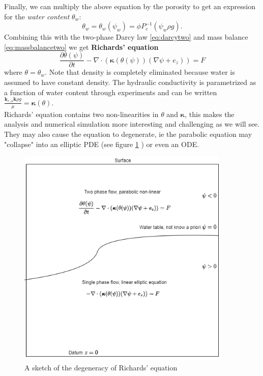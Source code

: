 \documentclass[../Main/main.tex]{subfiles}
\begin{document}
Finally, we can multiply the above equation by the porosity to get an expression for the \emph{water content} $\theta_w$:
\begin{equation*}
	\theta_w = \theta_w(\psi_w) = \phi P_c^{-1}(\psi_w\rho g).
\end{equation*}  
Combining this with the two-phase Darcy law \eqref{eq:darcytwo} and mass balance \eqref{eq:massbalancetwo} we get \textbf{Richards' equation}
\begin{equation}\label{eq:richards}
	\frac{\partial \theta(\psi)}{\partial t} - \nabla \cdot (\pmb{\kappa} (\theta (\psi))(\nabla \psi + e_z)) = F
\end{equation}
where $\theta = \theta_w$. Note that density is completely eliminated because water is assumed to have constant density. The hydraulic conductivity is parametrized as a function of water content through experiments and can be written  $\frac{\pmb{k}_{r,\alpha}\pmb{k}\rho g}{\mu} = \pmb{\kappa}(\theta)$. \\
Richards' equation contains two non-linearities in $\theta$ and $\pmb{\kappa}$, this makes the analysis and numerical simulation more interesting and challenging as we will see. They may also cause the equation to degenerate, ie the parabolic equation may "collapse" into an elliptic PDE (see figure \ref{fig:richards} ) or even an ODE.
\begin{figure}[h]
	\centering
	\includegraphics[width=0.9\textwidth]{Richards.png}
	\caption{A sketch of the degeneracy of Richards' equation}
	\label{fig:richards}
\end{figure}




\listoftodos[Notes]
 
\end{document}
